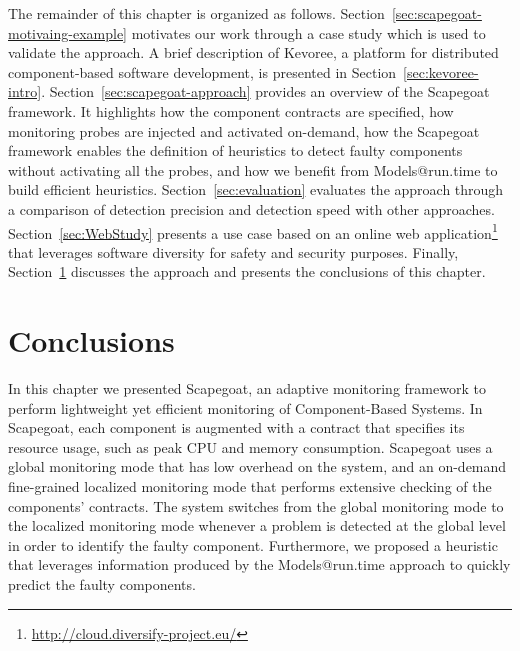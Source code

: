 The remainder of this chapter is organized as follows.
Section~\ref{sec:scapegoat-motivaing-example} motivates our work through a case study which is used to validate the approach.
A brief description of Kevoree, a platform for distributed component-based software development, is presented in Section~\ref{sec:kevoree-intro}.
Section~\ref{sec:scapegoat-approach} provides an overview of the Scapegoat framework.
It highlights how the component contracts are specified, how monitoring probes are injected and activated on-demand, how the Scapegoat framework enables the definition of heuristics to detect faulty components without activating all the probes, and how we benefit from Models@run.time to build efficient heuristics.
Section~\ref{sec:evaluation} evaluates the approach through a comparison of detection precision and detection speed with other approaches.
Section~\ref{sec:WebStudy} presents a use case based on an online web application\footnote{\url{http://cloud.diversify-project.eu/}} that leverages software diversity for safety and security purposes.
Finally, Section~\ref{sec:conclusion} discusses the approach and presents the conclusions of this chapter.




%

\section{Conclusions}\label{sec:conclusion}
In this chapter we presented Scapegoat, an adaptive monitoring framework to perform lightweight yet efficient monitoring of Component-Based Systems.
In Scapegoat, each component is augmented with a contract that specifies its resource usage, such as peak CPU and memory consumption.
Scapegoat uses a global monitoring mode that has low overhead on the system, and an on-demand fine-grained localized monitoring mode that performs extensive checking of the components' contracts.
The system switches from the global monitoring mode to the localized monitoring mode whenever a problem is detected at the global level in order to identify the faulty component.
Furthermore, we proposed a heuristic that leverages information produced by the Models@run.time approach to quickly predict the faulty components. 

